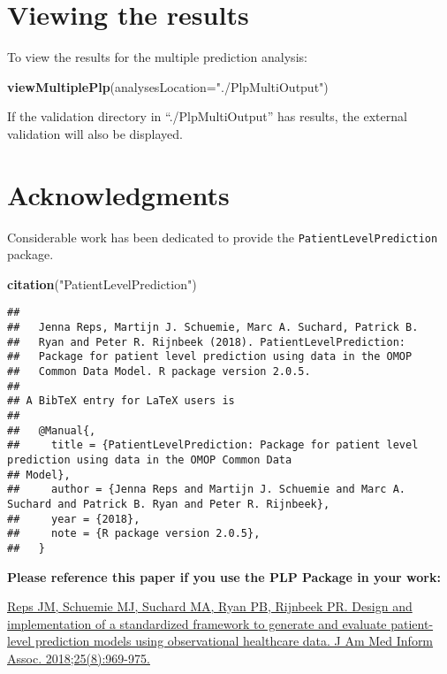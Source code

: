 \documentclass[]{article}
\newenvironment{Shaded}{\begin{snugshade}}{\end{snugshade}}
\newcommand{\KeywordTok}[1]{\textcolor[rgb]{0.13,0.29,0.53}{\textbf{#1}}}
\newcommand{\DataTypeTok}[1]{\textcolor[rgb]{0.13,0.29,0.53}{#1}}
\newcommand{\StringTok}[1]{\textcolor[rgb]{0.31,0.60,0.02}{#1}}
\newcommand{\NormalTok}[1]{#1}
\begin{document}
\section{Viewing the results}\label{viewing-the-results}

To view the results for the multiple prediction analysis:

\begin{Shaded}
\begin{Highlighting}[]
\KeywordTok{viewMultiplePlp}\NormalTok{(}\DataTypeTok{analysesLocation=}\StringTok{"./PlpMultiOutput"}\NormalTok{)}
\end{Highlighting}
\end{Shaded}

If the validation directory in ``./PlpMultiOutput'' has results, the
external validation will also be displayed.

\section{Acknowledgments}\label{acknowledgments}

Considerable work has been dedicated to provide the
\texttt{PatientLevelPrediction} package.

\begin{Shaded}
\begin{Highlighting}[]
\KeywordTok{citation}\NormalTok{(}\StringTok{"PatientLevelPrediction"}\NormalTok{)}
\end{Highlighting}
\end{Shaded}

\begin{verbatim}
## 
##   Jenna Reps, Martijn J. Schuemie, Marc A. Suchard, Patrick B.
##   Ryan and Peter R. Rijnbeek (2018). PatientLevelPrediction:
##   Package for patient level prediction using data in the OMOP
##   Common Data Model. R package version 2.0.5.
## 
## A BibTeX entry for LaTeX users is
## 
##   @Manual{,
##     title = {PatientLevelPrediction: Package for patient level prediction using data in the OMOP Common Data
## Model},
##     author = {Jenna Reps and Martijn J. Schuemie and Marc A. Suchard and Patrick B. Ryan and Peter R. Rijnbeek},
##     year = {2018},
##     note = {R package version 2.0.5},
##   }
\end{verbatim}

\textbf{Please reference this paper if you use the PLP Package in your
work:}

\href{http://dx.doi.org/10.1093/jamia/ocy032}{Reps JM, Schuemie MJ,
Suchard MA, Ryan PB, Rijnbeek PR. Design and implementation of a
standardized framework to generate and evaluate patient-level prediction
models using observational healthcare data. J Am Med Inform Assoc.
2018;25(8):969-975.}
\end{document}
